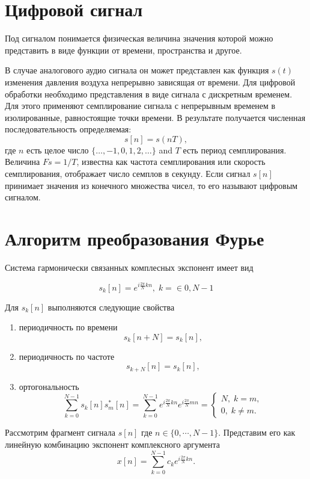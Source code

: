 \documentclass[oneside, final, 14pt]{extarticle}
\begin{document}
\cleardoublepage
\section{Цифровой сигнал}
  Под сигналом понимается физическая величина значения которой можно представить в виде функции от времени, пространства
  и другое.

  В случае аналогового аудио сигнала он может представлен как функция $s(t)$ изменения давления воздуха непрерывно
  зависящая от времени. Для цифровой обработки необходимо представления в виде сигнала с дискретным временем. Для
  этого применяют семплирование сигнала с непрерывным временем в изолированные, равностоящие точки времени. В результате
  получается численная последовательность определяемая:
  \[
    s[n] = s(nT),
  \]
  где $n$ есть целое число $\{\dots, -1, 0, 1, 2, \dots\}$ and $T$ есть период семплирования. Величина $Fs=1/T$, известна
  как частота семплирования или скорость семплирования, отображает число семплов в секунду. Если сигнал $s[n]$ принимает
  значения из конечного множества чисел, то его называют цифровым сигналом.

\cleardoublepage
\section{Алгоритм преобразования Фурье}
  Система гармонически связанных комплесных экспонент имеет вид

  \[
    s_k[n]=e^{i\tfrac{2\pi}{N}kn}, \; k=\in{0,N-1}
  \]

  Для $s_k[n]$ выполняются следующие свойства

  \begin{enumerate}
  \item периодичность по времени \[
    s_k[n + N] = s_k[n],
  \]
  \item периодичность по частоте
  \[
    s_{k+N}[n] = s_k[n],
  \]
  \item ортогональность
  \[
    \sum_{k=0}^{N-1} s_k[n]s_m^*[n] = \sum_{k=0}^{N-1} e^{i\tfrac{2\pi}{N}kn} e^{i\tfrac{2\pi}{N}mn} =
    \left\{ \begin{aligned}
        N, \; k = m ,\\
        0, \; k \not= m.
      \end{aligned}
    \right.
  \]
  \end{enumerate}

  Рассмотрим фрагмент сигнала $s[n]$ где $n \in \{0,\cdots,N-1\}$. Представим его как линейную комбинацию экспонент комплексного
  аргумента
  \[
    x[n] = \sum_{k=0}^{N-1} c_k e^{i\tfrac{2\pi}{N}kn}.
  \]
\end{document}
